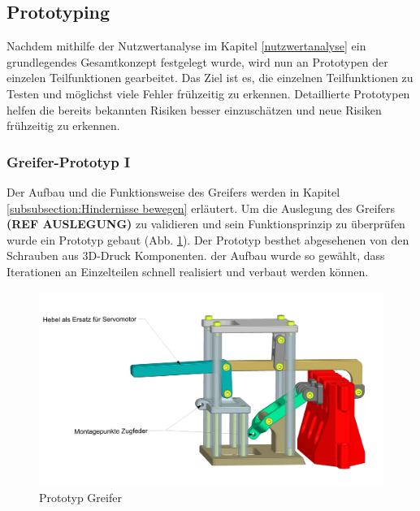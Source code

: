 \subsection{Prototyping}

Nachdem mithilfe der Nutzwertanalyse im Kapitel \ref{nutzwertanalyse} ein grundlegendes Gesamtkonzept festgelegt wurde, wird nun an Prototypen der einzelen Teilfunktionen gearbeitet. Das Ziel ist es, die einzelnen Teilfunktionen zu Testen und möglichst viele Fehler frühzeitig zu erkennen. Detaillierte Prototypen helfen die bereits bekannten Risiken besser einzuschätzen und neue Risiken frühzeitig zu erkennen.

\subsubsection{Greifer-Prototyp I}
\label{subsubsection:gripper-prototype-1}


Der Aufbau und die Funktionsweise des Greifers werden in Kapitel \ref{subsubsection:Hindernisse bewegen} erläutert. Um die Auslegung des Greifers \textbf{(REF AUSLEGUNG)} zu validieren und sein Funktionsprinzip zu überprüfen wurde ein Prototyp gebaut (Abb. \ref{fig:gripper-prototype-trimetric-notes}). Der Prototyp besthet abgesehenen von den Schrauben aus 3D-Druck Komponenten. der Aufbau wurde so gewählt, dass Iterationen an Einzelteilen schnell realisiert und verbaut werden können. 

\begin{figure}[H]
\centering
\includegraphics[width=1.0\textwidth]{assets/greifer-prototyp/Greifer_Trimetrisch_Notes.png}
\caption{Prototyp Greifer}
\label{fig:gripper-prototype-trimetric-notes}
\end{figure}

\newpage

